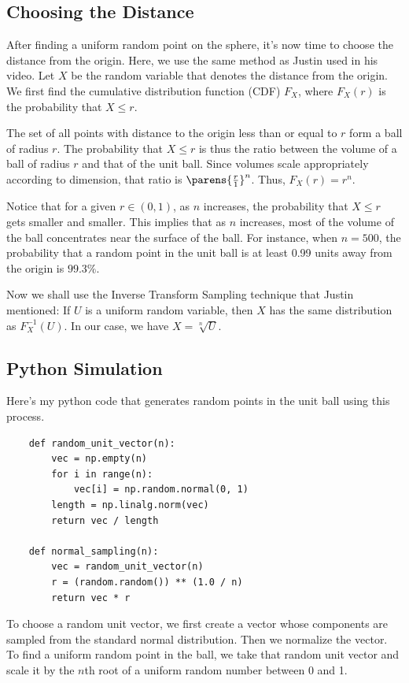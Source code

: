 \documentclass{article}
\begin{document}
\subsection{Choosing the Distance}

After finding a uniform random point on the sphere, it's now time to choose the distance from the origin. Here, we use the same method as Justin used in his video. Let $X$ be the random variable that denotes the distance from the origin. We first find the cumulative distribution function (CDF) $F_X$, where $F_X(r)$ is the probability that $X \leq r$.

The set of all points with distance to the origin less than or equal to $r$ form a ball of radius $r$. The probability that $X \leq r$ is thus the ratio between the volume of a ball of radius $r$ and that of the unit ball. Since volumes scale appropriately according to dimension, that ratio is $\parens{\frac{r}{1}}^n$. Thus, $F_X(r) = r^n$.

Notice that for a given $r \in (0, 1)$, as $n$ increases, the probability that $X \leq r$ gets smaller and smaller. This implies that as $n$ increases, most of the volume of the ball concentrates near the surface of the ball. For instance, when $n = 500$, the probability that a random point in the unit ball is at least 0.99 units away from the origin is $99.3\%$.

Now we shall use the Inverse Transform Sampling technique that Justin mentioned: If $U$ is a uniform random variable, then $X$ has the same distribution as $F_X^{-1}(U)$. In our case, we have $X = \sqrt[n]{U}$.

\subsection{Python Simulation}

Here's my python code that generates random points in the unit ball using this process.

\begin{verbatim}
    def random_unit_vector(n):
        vec = np.empty(n)
        for i in range(n):
            vec[i] = np.random.normal(0, 1)
        length = np.linalg.norm(vec)
        return vec / length
    
    def normal_sampling(n):
        vec = random_unit_vector(n)
        r = (random.random()) ** (1.0 / n)
        return vec * r
\end{verbatim}

To choose a random unit vector, we first create a vector whose components are sampled from the standard normal distribution. Then we normalize the vector. To find a uniform random point in the ball, we take that random unit vector and scale it by the $n$th root of a uniform random number between 0 and 1.
\end{document}
